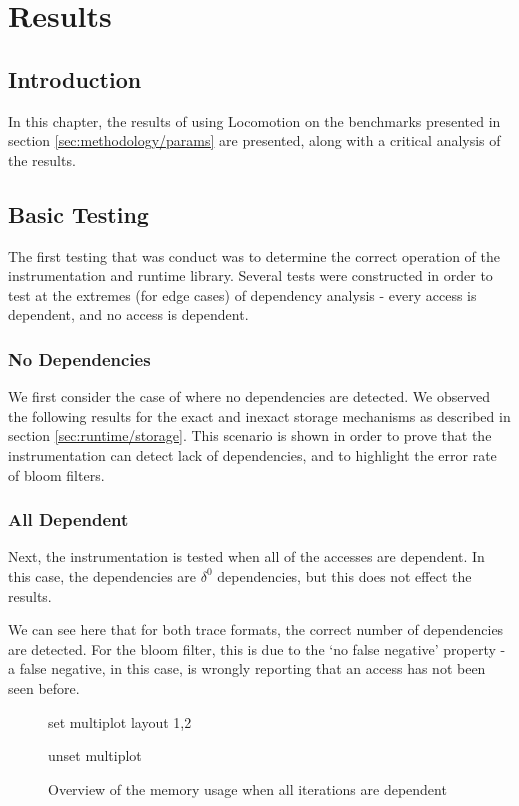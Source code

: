 \chapter{Results} \label{chp:results}
\section{Introduction} \label{sec:results/introduction}
In this chapter, the results of using Locomotion on the benchmarks presented in section \ref{sec:methodology/params} are presented, along with a critical analysis of the results.

\section{Basic Testing} \label{sec:results/basic}
The first testing that was conduct was to determine the correct operation of the instrumentation and runtime library. Several tests were constructed in order to test at the extremes (for edge cases) of dependency analysis - every access is dependent, and no access is dependent.

	\subsection{No Dependencies} \label{sec:result/basic/no-dep}
	We first consider the case of where no dependencies are detected. We observed the following results for the exact and inexact storage mechanisms as described in section \ref{sec:runtime/storage}. This scenario is shown in order to prove that the instrumentation can detect lack of dependencies, and to highlight the error rate of bloom filters.
	
	
	
	\subsection{All Dependent} \label{sec:result/basic/all-dep}
	Next, the instrumentation is tested when all of the accesses are dependent. In this case, the dependencies are $\delta^{0}$ dependencies, but this does not effect the results.

	We can see here that for both trace formats, the correct number of dependencies are detected. For the bloom filter, this is due to the `no false negative' property - a false negative, in this case, is wrongly reporting that an access has not been seen before.
	
	\begin{figure}
		\centering
		\begin{gnuplot}[terminal=pdf]
		set multiplot layout 1,2
					
		unset multiplot
		\end{gnuplot}
		\caption{Overview of the memory usage when all iterations are dependent}
		\label{chart:all-dependent-memory-comparison}
	\end{figure}
	
